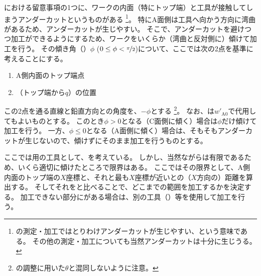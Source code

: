 \clearpage
\DimpleMilling における留意事項の1つに、ワークの内面（特にトップ端）と工具が接触してしまうアンダーカットというものがある
\footnote{\Dimple の測定・加工ではとりわけアンダーカットが生じやすい、という意味である。
その他の測定・加工についても当然アンダーカットは十分に生じうる。}。
特にA面側は工具へ向かう方向に湾曲があるため、アンダーカットが生じやすい。
そこで、アンダーカットを避けつつ加工ができるようにするため、ワークをいくらか（湾曲と反対側に）傾けて加工を行う。
その傾き角（\textbf{\DimpleAngle}）$\phi$ ($0 \leq \phi < \nicefrac\pi2$)について、ここでは次の2点を基準に考えることにする。
\begin{tcolorbox}[title=A面の\Dimple, fonttitle=\gtfamily\bfseries]
\begin{enumerate}[label=\sarrow]
\item A側内面のトップ端点
\item \AFaceDimpleFirstRow（トップ端から$q$）の位置
\end{enumerate}
\end{tcolorbox}\noindent
この2点を通る直線と鉛直方向との角度を、\DimpleAngle$-\phi$とする
\footnote{\AlocationLength の調整に用いた\AlocationAngle$\theta$と混同しないように注意。}。
なお、\TopEndACID は$w'_{\mathrm A0}$で代用してもよいものとする。
このとき$\phi > 0$となる（C面側に傾く）場合は$\phi$だけ傾けて加工を行う。
一方、$\phi \leq 0$となる（A面側に傾く）場合は、そもそもアンダーカットが生じないので、傾けずにそのまま加工を行うものとする。
\begin{hosoku}
ここでは\DimpleMilling 用の工具として、\TSlotCutter を考えている。
しかし、当然ながら\indexTDTSlotCutter\nameToolDiameter は有限であるため、いくら適切に傾けたところで限界はある。
ここではその限界として、A側内面のトップ端の$X$座標と、それと最も$X$座標が近い\Dimple との（$X$方向の）距離を算出する。
そしてそれを\indexTDTSlotCutter\nameToolDiameter と比べることで、どこまでの範囲を加工するかを決定する。
加工できない部分に\Dimple がある場合は、別の工具（\AngleHead）等を使用して加工を行う。
\end{hosoku}
